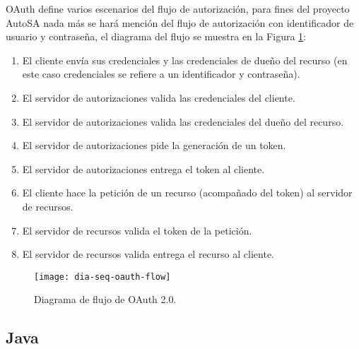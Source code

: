 OAuth define varios escenarios del flujo de autorización, para fines del proyecto AutoSA nada más se hará mención del flujo de autorización con identificador de usuario y contraseña\cite{OAuthRFC, OAuth2Identity}, el diagrama del flujo se muestra en la Figura \ref{fig:dia-seq-oauth-flow}:
\begin{enumerate}
	\item El cliente envía sus credenciales y las credenciales de dueño del recurso (en este caso credenciales se refiere a un identificador y contraseña).
	\item El servidor de autorizaciones valida las credenciales del cliente.
	\item El servidor de autorizaciones valida las credenciales del dueño del recurso.
	\item El servidor de autorizaciones pide la generación de un token.
	\item El servidor de autorizaciones entrega el token al cliente.
	\item El cliente hace la petición de un recurso (acompañado del token) al servidor de recursos.
	\item El servidor de recursos valida el token de la petición. 
	\item El servidor de recursos valida entrega el recurso al cliente.
\end{enumerate}

\begin{figure}[h]
	\centering
	\texttt{[image: dia-seq-oauth-flow]}
	\caption{Diagrama de flujo de OAuth 2.0.}
	\label{fig:dia-seq-oauth-flow}
\end{figure}

\subsection{Java}\label{sec:java}

